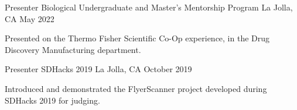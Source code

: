 \begin{cventries}

\cventry
    {Presenter} %
    {Biological Undergraduate and Master's Mentorship Program} %
    {La Jolla, CA} %
    {May 2022} %
    {
      \begin{cvitems} %
        \item {Presented on the Thermo Fisher Scientific Co-Op experience, in the Drug Discovery Manufacturing department.}
      \end{cvitems}
    }
  \cventry
    {Presenter} %
    {SDHacks 2019} %
    {La Jolla, CA} %
    {October 2019} %
    {
      \begin{cvitems} %
        \item {Introduced and demonstrated the FlyerScanner project developed during SDHacks 2019 for judging.}
      \end{cvitems}
    }
\end{cventries}